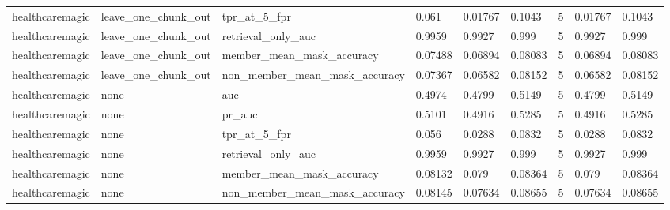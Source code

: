 \begin{tabular}{lllllllll}
healthcaremagic & leave\_one\_chunk\_out & tpr\_at\_5\_fpr & 0.061 & 0.01767 & 0.1043 & 5 & 0.01767 & 0.1043 \\
healthcaremagic & leave\_one\_chunk\_out & retrieval\_only\_auc & 0.9959 & 0.9927 & 0.999 & 5 & 0.9927 & 0.999 \\
healthcaremagic & leave\_one\_chunk\_out & member\_mean\_mask\_accuracy & 0.07488 & 0.06894 & 0.08083 & 5 & 0.06894 & 0.08083 \\
healthcaremagic & leave\_one\_chunk\_out & non\_member\_mean\_mask\_accuracy & 0.07367 & 0.06582 & 0.08152 & 5 & 0.06582 & 0.08152 \\
healthcaremagic & none & auc & 0.4974 & 0.4799 & 0.5149 & 5 & 0.4799 & 0.5149 \\
healthcaremagic & none & pr\_auc & 0.5101 & 0.4916 & 0.5285 & 5 & 0.4916 & 0.5285 \\
healthcaremagic & none & tpr\_at\_5\_fpr & 0.056 & 0.0288 & 0.0832 & 5 & 0.0288 & 0.0832 \\
healthcaremagic & none & retrieval\_only\_auc & 0.9959 & 0.9927 & 0.999 & 5 & 0.9927 & 0.999 \\
healthcaremagic & none & member\_mean\_mask\_accuracy & 0.08132 & 0.079 & 0.08364 & 5 & 0.079 & 0.08364 \\
healthcaremagic & none & non\_member\_mean\_mask\_accuracy & 0.08145 & 0.07634 & 0.08655 & 5 & 0.07634 & 0.08655 \\
\bottomrule
\end{tabular}
